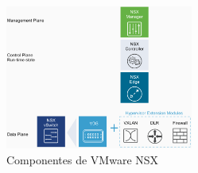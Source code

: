 \begin{itemize}
        \begin{figure}[h!]
            \centering
            \includegraphics[width=0.55\textwidth]{imaxes/conceptosPrevios/planosNSX.png}
            \caption{Componentes de VMware NSX}
            \label{fig:planosNSX}
        \end{figure}
        \FloatBarrier
        

\end{itemize}

